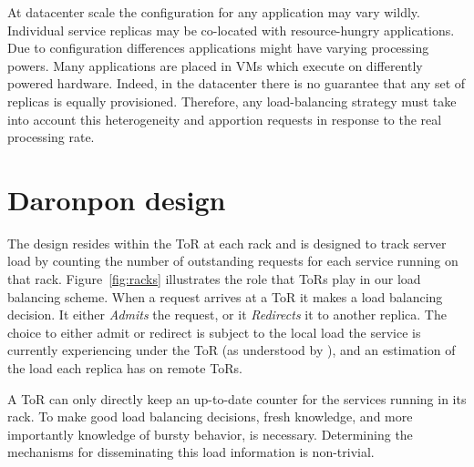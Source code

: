 At datacenter scale the configuration for any application may vary wildly.
Individual service replicas may be co-located with resource-hungry applications.
Due to configuration differences applications might have varying processing
powers. Many applications are placed in VMs which execute on differently
powered hardware. Indeed, in the datacenter there is no guarantee that any set
of replicas is equally provisioned. Therefore, any load-balancing strategy must
take into account this heterogeneity and apportion requests in response to the
real processing rate.

\section{Daronpon design}
\label{darapon:sec:design}

The \daronpon design resides within the ToR at each rack and is designed to
track server load by counting the number of outstanding requests for each
service running on that rack. Figure~\ref{fig:racks} illustrates the role that
ToRs play in our load balancing scheme.  When a request arrives at a ToR it
makes a load balancing decision. It either \textit{Admits} the request, or it
\textit{Redirects} it to another replica. The choice to either admit or
redirect is subject to the local load the service is currently experiencing
under the ToR (as understood by \daronpon), and an estimation of the load
each replica has on remote ToRs. 


A ToR can only directly keep an up-to-date counter for the services running in
its rack. To make good load balancing decisions, fresh knowledge, and more
importantly knowledge of bursty behavior, is necessary.  Determining the
mechanisms for disseminating this load information is non-trivial.

